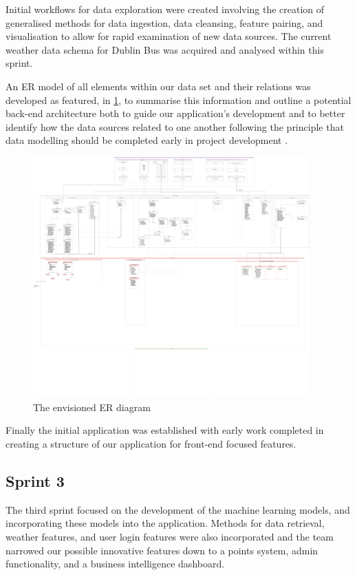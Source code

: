 \documentclass[]{UCD_CS_47360_Report}
\begin{document}
Initial workflows for data exploration were created involving the creation of generalised methods for data ingestion, data cleansing, feature pairing, and visualisation to allow for rapid examination of new data sources. The current weather data schema for Dublin Bus was acquired and analysed within this sprint. 

An ER model of all elements within our data set and their relations was developed as featured, in \ref{fig:ERDiagram}, to summarise this information and outline a potential back-end architecture both to guide our application's development and to better identify how the data sources related to one another following the principle that data modelling should be completed early in project development \cite{DataModel}.
\begin{figure}[!htb]
    \centering
    \includegraphics[width=0.95\textwidth]{figures/FinalER.png}
    \caption{The envisioned ER diagram}
    \label{fig:ERDiagram}
\end{figure}

Finally the initial application was established with early work completed in creating a structure of our application for front-end focused features.

\subsection{Sprint 3}
The third sprint focused on the development of the machine learning models, and incorporating these models into the application. Methods for data retrieval, weather features, and user login features were also incorporated and the team narrowed our possible innovative features down to a points system, admin functionality, and a business intelligence dashboard.
\end{document}
